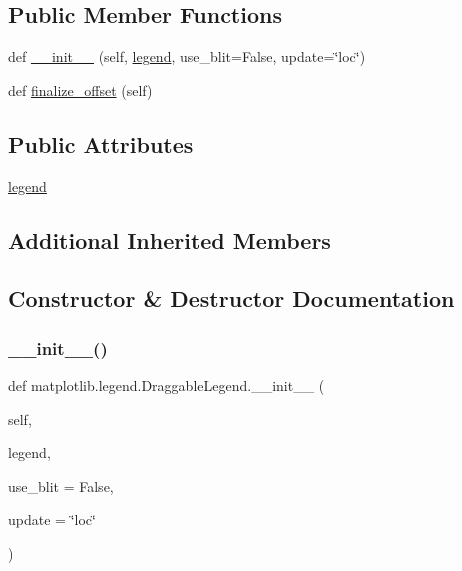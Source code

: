 \subsection*{Public Member Functions}
\begin{DoxyCompactItemize}
\item 
def \hyperlink{classmatplotlib_1_1legend_1_1DraggableLegend_a59a94d442ee03e8d2b6a71398a1fba1f}{\+\_\+\+\_\+init\+\_\+\+\_\+} (self, \hyperlink{classmatplotlib_1_1legend_1_1DraggableLegend_a3d1647186fa48f665c7708207ee9a8b5}{legend}, use\+\_\+blit=False, update=\char`\"{}loc\char`\"{})
\item 
def \hyperlink{classmatplotlib_1_1legend_1_1DraggableLegend_ae0bfdd2296b614762a70eace7d0f34dd}{finalize\+\_\+offset} (self)
\end{DoxyCompactItemize}
\subsection*{Public Attributes}
\begin{DoxyCompactItemize}
\item 
\hyperlink{classmatplotlib_1_1legend_1_1DraggableLegend_a3d1647186fa48f665c7708207ee9a8b5}{legend}
\end{DoxyCompactItemize}
\subsection*{Additional Inherited Members}


\subsection{Constructor \& Destructor Documentation}
\mbox{\label{classmatplotlib_1_1legend_1_1DraggableLegend_a59a94d442ee03e8d2b6a71398a1fba1f}} 
\subsubsection{\texorpdfstring{\+\_\+\+\_\+init\+\_\+\+\_\+()}{\_\_init\_\_()}}
{\footnotesize\ttfamily def matplotlib.\+legend.\+Draggable\+Legend.\+\_\+\+\_\+init\+\_\+\+\_\+ (\begin{DoxyParamCaption}\item[{}]{self,  }\item[{}]{legend,  }\item[{}]{use\+\_\+blit = {\ttfamily False},  }\item[{}]{update = {\ttfamily \char`\"{}loc\char`\"{}} }\end{DoxyParamCaption})}

